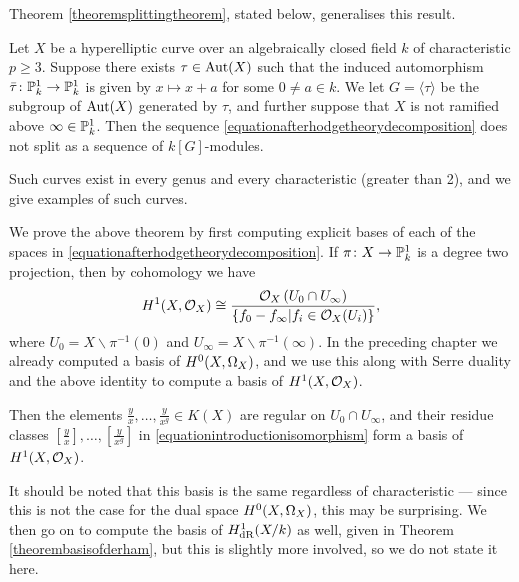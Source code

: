 Theorem \ref{theoremsplittingtheorem}, stated below, generalises this result.
    \begin{unnumthm}
    Let $X$ be a hyperelliptic curve over an algebraically closed field $k$ of characteristic $p \geq 3$.
    Suppose there exists $\tau \in \operatorname{Aut}(X)$ such that the induced automorphism $\bar \tau \colon \mathbb P_k^1 \rightarrow \mathbb P_k^1$ is given by $x \mapsto x+a$ for some $0 \neq a \in k$.
    We let $G = \langle \tau \rangle$ be the subgroup of $\operatorname{Aut}(X)$ generated by $\tau$, and further suppose that $X$ is not ramified above $\infty \in {\mathbb P}_k^1$.
    Then the sequence \eqref{equationafterhodgetheorydecomposition} does not split as a sequence of $k[G]$-modules.
    \end{unnumthm}
Such curves exist in every genus and every characteristic (greater than 2), and we give examples of such curves.%

We prove the above theorem by first computing explicit bases of each of the spaces in \eqref{equationafterhodgetheorydecomposition}.
If $\pi \colon X \rightarrow {\mathbb P}_k^1$ is a degree two projection, then by \cech cohomology we have
        \begin{equation}\label{equationintroductionisomorphism}
        H^1(X,\mathcal{O}_X) \cong \frac{{\cal O}_X\left(U_0 \cap U_\infty\right)}{\{ f_0 - f_\infty | f_i \in {\cal O}_X(U_i)\}},
        \end{equation}
where $U_0 = X \backslash \pi^{-1}(0)$ and $U_\infty = X \backslash \pi^{-1}(\infty)$.
In the preceding chapter we already computed a basis of ${H^0(X,\Omega_X)}$, and we use this along with Serre duality and the above identity to compute a basis of $H^1(X,\mathcal{O}_X)$.
    \begin{unnumthm}
    Then the elements $\frac{y}{x}, \ldots, \frac{y}{x^g} \in K(X)$ are regular on $U_0 \cap U_\infty$, and their residue classes $\left [ \frac{y}{x} \right ],  \ldots, \left [ \frac{y}{x^g} \right]$ in \eqref{equationintroductionisomorphism} form a basis of $H^1(X,\mathcal{O}_X)$.
    \end{unnumthm}
 It should be noted that this basis is the same regardless of characteristic --- since this is not the case for the dual space ${H^0(X,\Omega_X)}$, this may be surprising.
 We then go on to compute the basis of $H_{\text {dR}}^1(X/k)$ as well, given in Theorem \ref{theorembasisofderham}, but this is slightly more involved, so we do not state it here.


